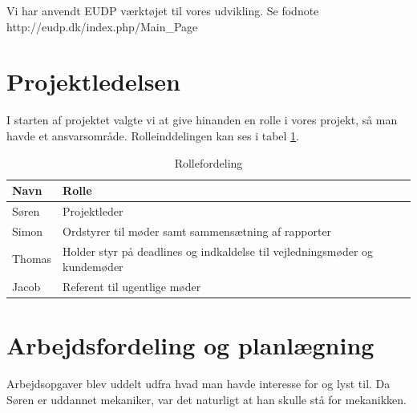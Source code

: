 Vi har anvendt EUDP værktøjet til vores udvikling. Se fodnote http://eudp.dk/index.php/Main_Page

\section{Projektledelsen}
\label{sec:projektledelsen}

I starten af projektet valgte vi at give hinanden en rolle i vores projekt, så man havde et ansvarsområde. Rolleinddelingen kan ses i tabel \ref{tab:rolle}.
\begin{table}[h]
  \centering
\begin{tabular}{ll}
\textbf{Navn} & \textbf{Rolle} \\
\hline
Søren & Projektleder \\
Simon & Ordstyrer til møder samt sammensætning af rapporter \\
Thomas & Holder styr på deadlines og indkaldelse til vejledningsmøder og kundemøder \\
Jacob & Referent til ugentlige møder \\
\end{tabular}
  \caption{Rollefordeling}
  \label{tab:rolle}
\end{table}

\section{Arbejdsfordeling og planlægning}
\label{sec:arbejdsfordeling:-}

Arbejdsopgaver blev uddelt udfra hvad man havde interesse for og lyst til. Da Søren er uddannet mekaniker, var det naturligt at han skulle stå for mekanikken. 



